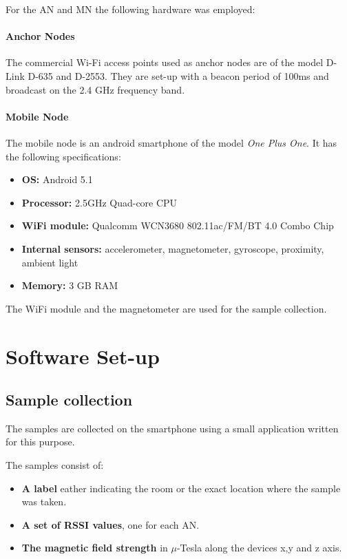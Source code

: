 For the AN and MN the following hardware was employed:

\paragraph{Anchor Nodes}
The commercial Wi-Fi access points used as anchor nodes are of the model D-Link D-635 and D-2553. They are set-up with a beacon period of 100ms and broadcast on the 2.4 GHz frequency band.

\paragraph{Mobile Node}

The mobile node is an android smartphone of the model \emph{One Plus One}. It has the following specifications:

\begin{itemize}
\item \textbf{OS:} Android 5.1
\item \textbf{Processor:} 2.5GHz Quad-core CPU
\item \textbf{WiFi module:} Qualcomm WCN3680 802.11ac/FM/BT 4.0 Combo Chip 
\item \textbf{Internal sensors:} accelerometer, magnetometer, gyroscope, proximity, ambient light
\item \textbf{Memory:} 3 GB RAM
\end{itemize}

The WiFi module and the magnetometer are used for the sample collection.


\section{Software Set-up}

\subsection{Sample collection}

The samples are collected on the smartphone using a small application written for this purpose.

The samples consist of:
\begin{itemize}
\item \textbf{A label} eather indicating the room or the exact location where the sample was taken.
\item \textbf{A set of RSSI values}, one for each AN.
\item \textbf{The magnetic field strength} in \(\mu\)-Tesla along the devices x,y and z axis.
\end{itemize}

